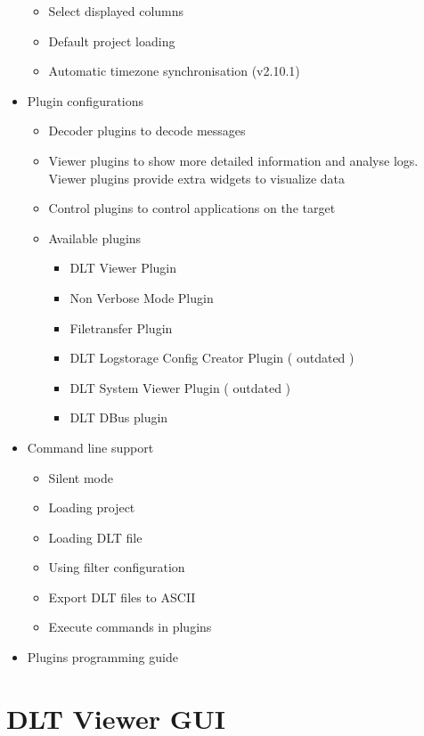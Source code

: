 \documentclass[a4paper,11pt]{article}
\begin{document}
\begin{itemize}
\begin{itemize}
    \item Select displayed columns
    \item Default project loading
    \item Automatic timezone synchronisation (v2.10.1)
   \end{itemize}
\item Plugin configurations
   \begin{itemize}
    \item Decoder plugins to decode messages
    \item Viewer plugins to show more detailed information and analyse logs. Viewer plugins provide extra widgets to visualize data
    \item Control plugins to control applications on the target
    \item Available plugins
     \begin{itemize}
        \item DLT Viewer Plugin
        \item Non Verbose Mode Plugin
        \item Filetransfer Plugin
        \item DLT Logstorage Config Creator Plugin ( outdated )
        \item DLT System Viewer Plugin ( outdated )
        \item DLT DBus plugin
     \end{itemize}
   \end{itemize}
\item Command line support
 \begin{itemize}
    \item Silent mode
    \item Loading project
    \item Loading DLT file
    \item Using filter configuration
    \item Export DLT files to ASCII
    \item Execute commands in plugins
 \end{itemize}
\item Plugins programming guide
\end{itemize}

\pagebreak

\section{DLT Viewer GUI}
\end{document}
